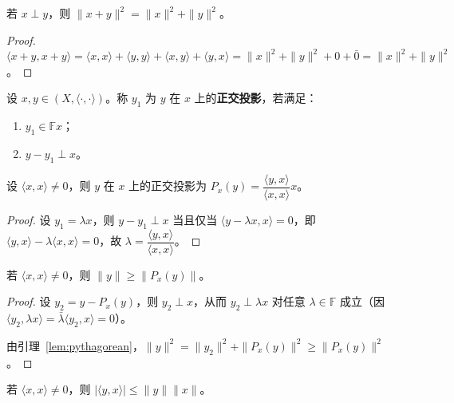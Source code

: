 \documentclass[lang=cn,a4paper,newtx,section]{elegantbook}
\begin{document}
\begin{lemma}[勾股定理]\label{lem:pythagorean}
  若 $x\perp y$，则 $\|x+y\|^2=\|x\|^2+\|y\|^2$。
\end{lemma}

\begin{proof}
  $\langle x+y,x+y\rangle=\langle x,x\rangle+\langle y,y\rangle+\langle x,y\rangle+\langle y,x\rangle=\|x\|^2+\|y\|^2+0+\bar{0}=\|x\|^2+\|y\|^2$。
\end{proof}

\begin{definition}[正交投影]
  设 $x,y\in(X,\langle\cdot,\cdot\rangle)$。称 $y_1$ 为 $y$ 在 $x$ 上的\textbf{正交投影}，若满足：
  \begin{enumerate}
    \item $y_1\in\mathbb{F}x$；
    \item $y-y_1\perp x$。
  \end{enumerate}
\end{definition}

\begin{proposition}\label{prop:orthogonal-projection}
  设 $\langle x,x\rangle\ne 0$，则 $y$ 在 $x$ 上的正交投影为 $P_x(y)=\dfrac{\langle y,x\rangle}{\langle x,x\rangle}x$。
\end{proposition}

\begin{proof}
  设 $y_1=\lambda x$，则 $y-y_1\perp x$ 当且仅当 $\langle y-\lambda x,x\rangle=0$，即 $\langle y,x\rangle-\lambda\langle x,x\rangle=0$，故 $\lambda=\dfrac{\langle y,x\rangle}{\langle x,x\rangle}$。
\end{proof}

\begin{proposition}\label{prop:projection-inequality}
  若 $\langle x,x\rangle\ne 0$，则 $\|y\|\ge\|P_x(y)\|$。
\end{proposition}

\begin{proof}
  设 $y_2=y-P_x(y)$，则 $y_2\perp x$，从而 $y_2\perp\lambda x$ 对任意 $\lambda\in\mathbb{F}$ 成立（因 $\langle y_2,\lambda x\rangle=\bar{\lambda}\langle y_2,x\rangle=0$）。

  由引理~\ref{lem:pythagorean}，$\|y\|^2=\|y_2\|^2+\|P_x(y)\|^2\ge\|P_x(y)\|^2$。
\end{proof}

\begin{corollary}\label{cor:cauchy-schwarz-nonzero}
  若 $\langle x,x\rangle\ne 0$，则 $|\langle y,x\rangle|\le\|y\|\|x\|$。
\end{corollary}
\end{document}

